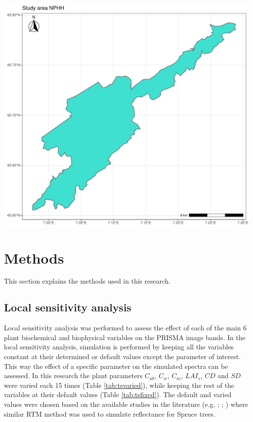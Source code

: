 \documentclass[a4paper, twoside]{templates/ociamthesis}
\let\origfigure\figure
\let\endorigfigure\endfigure
\renewenvironment{figure}[1][2] {
    \expandafter\origfigure\expandafter[H]
} {
    \endorigfigure
}
\begin{document}
\begin{figure}
\includegraphics[width=0.9\linewidth]{./figures/map_np} \caption{The study area.}\label{fig:npmap}
\end{figure}

\hypertarget{methods}{%
\chapter{Methods}\label{methods}}

This section explains the methods used in this research.

\hypertarget{local-sensitivity-analysis}{%
\section{Local sensitivity analysis}\label{local-sensitivity-analysis}}

Local sensitivity analysis was performed to assess the effect of each of the main 6 plant biochemical and biophysical variables on the PRISMA image bands. In the local sensitivity analysis, simulation is performed by keeping all the variables constant at their determined or default values except the parameter of interest. This way the effect of a specific parameter on the simulated spectra can be assessed. In this research the plant parameters \(C_{ab}\), \(C_{w}\), \(C_{m}\), \(LAI_{s}\), \(CD\) and \(SD\) were varied each 15 times (Table \ref{tab:tsvaried}), while keeping the rest of the variables at their default values (Table \ref{tab:tsfixed}). The default and varied values were chosen based on the available studies in the literature (e.g. \citet{darvishzadeh2019mapping}; \citet{laurent2011inversion}; \citet{schlerf2012vegetation}) where similar RTM method was used to simulate reflectance for Spruce trees.
\end{document}
